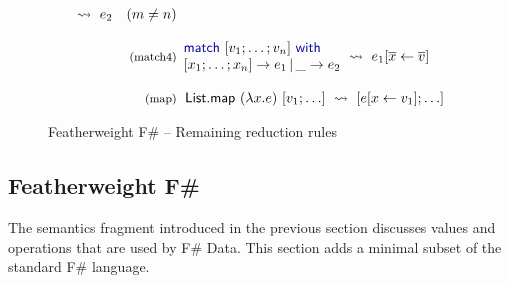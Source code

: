 \documentclass[preprint]{sigplanconf}
\newcommand{\kvd}[1]{\textnormal{\textcolor{kvdclr}{\sffamily #1}}}
\newcommand{\ident}[1]{\textnormal{\sffamily #1}}
\newcommand{\reduce}{\rightsquigarrow}
\begin{document}
\begin{figure}
\begin{equation*}
\begin{array}{rl}
\begin{array}{l}
 \end{array} \hspace{-0.5em} ~\reduce~ e_2\quad(m\neq n) \\
 \\
 \textnormal{\footnotesize{(match4)}}&
 \hspace{-1em}
 \begin{array}{l}
  \kvd{match}~[v_1;\ldots;v_n]~\kvd{with} \\[0em]
  [x_1;\ldots;x_n ] \rightarrow e_1 \,|\, \_ \rightarrow e_2
 \end{array} \hspace{-0.5em} ~\reduce~ e_1[\overline{x}\leftarrow\overline{v}] \\
 \\
 \textnormal{\footnotesize{(map)}}&
 \hspace{-0.4em}
 \ident{List.map}~(\lambda x.e)~[v_1; \ldots] ~\reduce~ [e[x\leftarrow v_1]; \ldots] \\
\end{array}
\end{equation*}

\caption{Featherweight F\# -- Remaining reduction rules}
\label{fig:ff-reduction}
\vspace{-1em}
\end{figure}


\subsection{Featherweight F\#}
\label{sec:formal-ff}

The semantics fragment introduced in the previous section discusses values and operations that are used by
F\# Data. This section adds a minimal subset of the standard F\# language.
\end{document}

